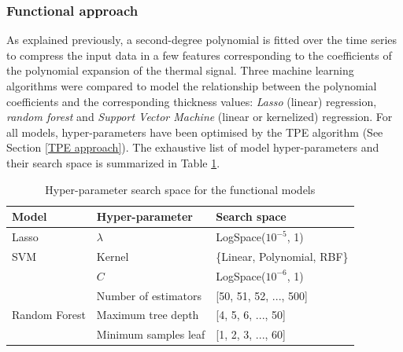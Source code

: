 \subsubsection{Functional approach}

As explained previously, a second-degree polynomial is fitted over the time series to compress the input data in a few features corresponding to the coefficients of the polynomial expansion of the thermal signal. Three machine learning algorithms were compared to model the relationship between the polynomial coefficients and the corresponding thickness values: \textit{Lasso} (linear) regression, \textit{random forest} and \textit{Support Vector Machine} (linear or kernelized) regression. For all models,  hyper-parameters have been optimised by the TPE algorithm (See Section \ref{TPE approach}). 
%
The exhaustive list of model hyper-parameters and their search space is summarized in Table \ref{tab:functional_search_space}.

\begin{table}
\centering
\label{tab:functional_search_space}
\caption{Hyper-parameter search space for the functional models}
\begin{tabular}{lll} 
\toprule
\textbf{Model}                            & \textbf{Hyper-parameter} & \textbf{Search space}                          \\ 
\midrule
Lasso                                     & $\lambda$                & LogSpace($10^{-5}$, 1)                          \\ 
\midrule
SVM  & Kernel                   & \{Linear, Polynomial, RBF\}  \\ 
\cline{2-3}
                                          & $C$                        & LogSpace($10^{-6}$, 1)                          \\ 
\midrule
\multirow{3}{*}{Random Forest}  & Number of estimators     & {[}50, 51, 52, ..., 500]                       \\ 
\cline{2-3}
                                          & Maximum tree depth       & {[}4, 5, 6, ..., 50]                           \\ 
\cline{2-3}
                                          & Minimum samples leaf     & {[}1, 2, 3, ..., 60]                           \\
\bottomrule
\end{tabular}
\end{table}


